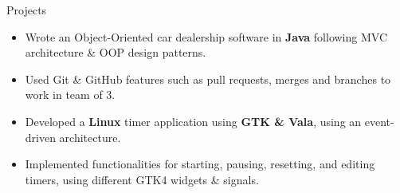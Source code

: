 \documentclass{resume} %
\begin{document}
\begin{workSection}{Projects}
	\customItem[
		title=\href{https://github.com/AshkanArabim/OOP-project-1}{CLI Car Dealership \faExternalLink},
		duration=April 2024,
	]
	\begin{itemize}
		\vspace{-0.5em}
		\itemsep -6pt {}
		\item Wrote an Object-Oriented car dealership software in \textbf{Java} following MVC architecture \& OOP design patterns. %
		\item Used Git \& GitHub features such as pull requests, merges and branches to work in team of 3.
	\end{itemize}
	
	\customItem[
		title=\href{https://github.com/AshkanArabim/gtk-timer}{Linux Timer \faExternalLink},
		duration=January 2024,
	]
	\begin{itemize}
		\vspace{-0.5em}
		\itemsep -6pt {}
		\item Developed a \textbf{Linux} timer application using \textbf{GTK \& Vala}, using an event-driven architecture.
		\item Implemented functionalities for starting, pausing, resetting, and editing timers, using different GTK4 widgets \& signals.
	\end{itemize}
	

\end{workSection}
\end{document}
